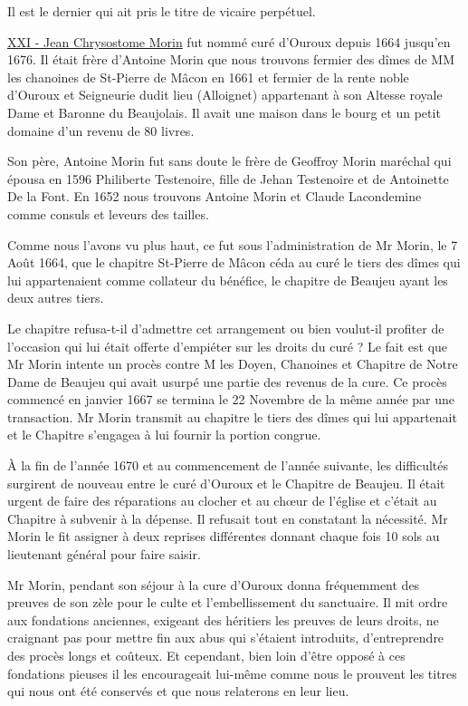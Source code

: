 Il est le dernier qui ait pris le titre de vicaire perpétuel.

\underline{XXI - Jean Chrysostome Morin} fut nommé curé d'Ouroux depuis 1664 jusqu'en 1676. Il était frère d'Antoine Morin que nous trouvons fermier des dîmes de MM les chanoines de St-Pierre de Mâcon en 1661 et fermier de la rente noble d'Ouroux et Seigneurie dudit lieu (Alloignet) appartenant à son Altesse royale Dame et Baronne du Beaujolais. Il avait une maison dans le bourg et un petit domaine d'un revenu de 80 livres.

Son père, Antoine Morin fut sans doute le frère de Geoffroy Morin maréchal qui épousa en 1596 Philiberte Testenoire, fille de Jehan Testenoire et de Antoinette De la Font. En 1652 nous trouvons Antoine Morin et Claude Lacondemine comme consuls et leveurs des tailles.

Comme nous l'avons vu plus haut, ce fut sous l'administration de Mr Morin, le 7 Août 1664, que le chapitre St-Pierre de Mâcon céda au curé le tiers des dîmes qui lui appartenaient comme collateur du bénéfice, le chapitre de Beaujeu ayant les deux autres tiers.

Le chapitre refusa-t-il d'admettre cet arrangement ou bien voulut-il profiter de l'occasion qui lui était offerte d'empiéter sur les droits du curé ? Le fait est que Mr Morin intente un procès contre M les Doyen, Chanoines et Chapitre de Notre Dame de Beaujeu qui avait usurpé une partie des revenus de la cure. Ce procès commencé en janvier 1667 se termina le 22 Novembre de la même année par une transaction. Mr Morin transmit au chapitre le tiers des dîmes qui lui appartenait et le Chapitre s'engagea à lui fournir la portion congrue.

À la fin de l'année 1670 et au commencement de l'année suivante, les difficultés surgirent de nouveau entre le curé d'Ouroux et le Chapitre de Beaujeu. Il était urgent de faire des réparations au clocher et au chœur de l'église et c'était au Chapitre à subvenir à la dépense. Il refusait tout en constatant la nécessité. Mr Morin le fit assigner à deux reprises différentes donnant chaque fois 10 sols au lieutenant général pour faire saisir.

Mr Morin, pendant son séjour à la cure d'Ouroux donna fréquemment des preuves de son zèle pour le culte et l'embellissement du sanctuaire. Il mit ordre aux fondations anciennes, exigeant des héritiers les preuves de leurs droits, ne craignant pas pour mettre fin aux abus qui s'étaient introduits, d'entreprendre des procès longs et coûteux. Et cependant, bien loin d'être opposé à ces fondations pieuses il les encourageait lui-même comme nous le prouvent les titres qui nous ont été conservés et que nous relaterons en leur lieu.

